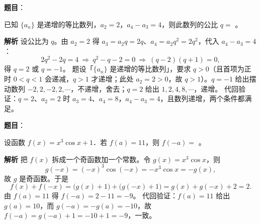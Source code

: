 \begin{answer}

\textbf{题目}：

已知 $\{a_n\}$ 是递增的等比数列，$a_2=2$，$a_4-a_3=4$，则此数列的公比 $q=$ \gkblank{}。

\textbf{解析}
设公比为 $q$。由 $a_2=2$ 得 $a_3=a_2q=2q$、$a_4=a_2q^2=2q^2$，代入 $a_4-a_3=4$：
\nopagebreak[4]
\[
2q^2-2q=4\ \Longrightarrow\ q^2-q-2=0\ \Longrightarrow\ (q-2)(q+1)=0,
\]
得 $q=2$ 或 $q=-1$。
题设「$\{a_n\}$ 是递增的等比数列」，要求 $q>0$（且首项为正时 $0<q<1$ 会递减，$q>1$ 才递增；此处 $a_2=2>0$，故 $q>1$）。$q=-1$ 给出摆动数列 $-2,2,-2,2,\cdots$，不递增，舍去；$q=2$ 给出 $1,2,4,8,\cdots$，递增。
代回验证：$q=2$、$a_2=2$ 时 $a_3=4$、$a_4=8$，$a_4-a_3=4$，且数列递增，两个条件都满足。


\end{answer}
\begin{answer}

\textbf{题目}：

设函数 $f(x)=x^3\cos x+1$．若 $f(a)=11$，则 $f(-a)=$ \gkblank{}。

\textbf{解析}
把 $f(x)$ 拆成一个奇函数加一个常数。令 $g(x)=x^3\cos x$，则
\nopagebreak[4]
\[
g(-x)=(-x)^3\cos(-x)=-x^3\cos x=-g(x),
\]
故 $g$ 是奇函数。于是
\nopagebreak[4]
\[
f(x)+f(-x)=\big(g(x)+1\big)+\big(g(-x)+1\big)=g(x)+g(-x)+2=2.
\]
由 $f(a)=11$ 得 $f(-a)=2-11=-9$。
代回验证：$f(a)=11$ 给出 $g(a)=10$，而 $g(-a)=-g(a)=-10$，故 $f(-a)=g(-a)+1=-10+1=-9$，一致。


\end{answer}
